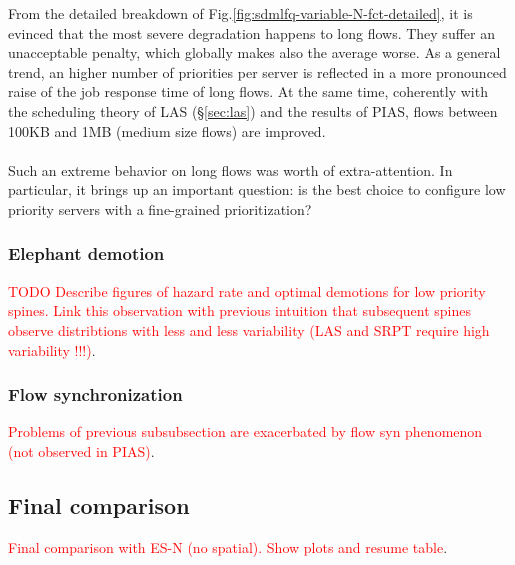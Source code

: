 From the detailed breakdown of Fig.\ref{fig:sdmlfq-variable-N-fct-detailed}, it is evinced that the most severe degradation happens to long flows. They suffer an unacceptable penalty, which globally makes also the average worse. As a general trend, an higher number of priorities per server is reflected in a more pronounced raise of the job response time of long flows. At the same time, coherently with the scheduling theory of LAS (\S \ref{sec:las}) and the results of PIAS, flows between 100KB and 1MB (medium size flows) are improved. \\ \\
Such an extreme behavior on long flows was worth of extra-attention. In particular, it brings up an important question: is the best choice to configure low priority servers with a fine-grained prioritization?
\subsubsection{Elephant demotion}
\textcolor{red}{TODO Describe figures of hazard rate and optimal demotions for low priority spines. Link this observation with previous intuition that subsequent spines observe distribtions with less and less variability (LAS and SRPT require high variability !!!)}. 
\subsubsection{Flow synchronization}
\textcolor{red}{Problems of previous subsubsection are exacerbated by flow syn phenomenon (not observed in PIAS)}.
\subsection{Final comparison}
\textcolor{red}{Final comparison with ES-N (no spatial). Show plots and resume table}.
